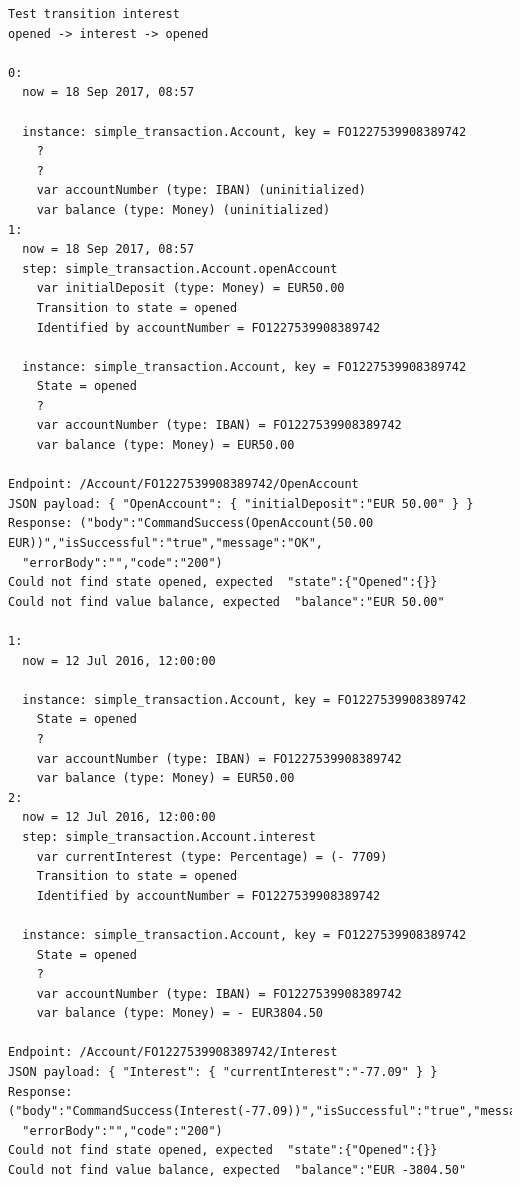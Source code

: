 \begin{sourcecode}[h!]
\begin{lstlisting}[]
Test transition interest
opened -> interest -> opened

0:
  now = 18 Sep 2017, 08:57

  instance: simple_transaction.Account, key = FO1227539908389742
    ?
    ?
    var accountNumber (type: IBAN) (uninitialized)
    var balance (type: Money) (uninitialized)
1:
  now = 18 Sep 2017, 08:57
  step: simple_transaction.Account.openAccount
    var initialDeposit (type: Money) = EUR50.00
    Transition to state = opened
    Identified by accountNumber = FO1227539908389742

  instance: simple_transaction.Account, key = FO1227539908389742
    State = opened
    ?
    var accountNumber (type: IBAN) = FO1227539908389742
    var balance (type: Money) = EUR50.00

Endpoint: /Account/FO1227539908389742/OpenAccount
JSON payload: { "OpenAccount": { "initialDeposit":"EUR 50.00" } }
Response: ("body":"CommandSuccess(OpenAccount(50.00 EUR))","isSuccessful":"true","message":"OK",
  "errorBody":"","code":"200")
Could not find state opened, expected  "state":{"Opened":{}}
Could not find value balance, expected  "balance":"EUR 50.00"

1:
  now = 12 Jul 2016, 12:00:00

  instance: simple_transaction.Account, key = FO1227539908389742
    State = opened
    ?
    var accountNumber (type: IBAN) = FO1227539908389742
    var balance (type: Money) = EUR50.00
2:
  now = 12 Jul 2016, 12:00:00
  step: simple_transaction.Account.interest
    var currentInterest (type: Percentage) = (- 7709)
    Transition to state = opened
    Identified by accountNumber = FO1227539908389742

  instance: simple_transaction.Account, key = FO1227539908389742
    State = opened
    ?
    var accountNumber (type: IBAN) = FO1227539908389742
    var balance (type: Money) = - EUR3804.50

Endpoint: /Account/FO1227539908389742/Interest
JSON payload: { "Interest": { "currentInterest":"-77.09" } }
Response: ("body":"CommandSuccess(Interest(-77.09))","isSuccessful":"true","message":"OK",
  "errorBody":"","code":"200")
Could not find state opened, expected  "state":{"Opened":{}}
Could not find value balance, expected  "balance":"EUR -3804.50"
\end{lstlisting}
\caption{}\label{fig:result-dist-codegenakka-interest}
\end{sourcecode}
\FloatBarrier

